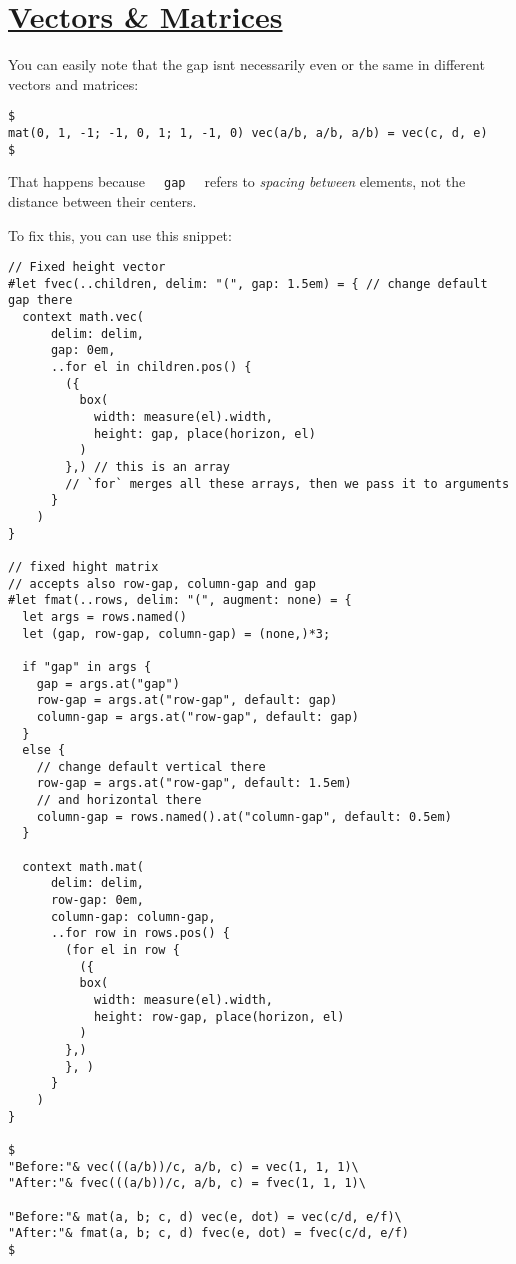 \section{\texorpdfstring{\hyperref[vectors--matrices]{Vectors \&
Matrices}}{Vectors \& Matrices}}\label{vectors--matrices}

You can easily note that the gap isn\textquotesingle t necessarily even
or the same in different vectors and matrices:

\begin{verbatim}
$
mat(0, 1, -1; -1, 0, 1; 1, -1, 0) vec(a/b, a/b, a/b) = vec(c, d, e)
$
\end{verbatim}

\pandocbounded{}

That happens because \texttt{\ }{\texttt{\ gap\ }}\texttt{\ } refers to
\emph{spacing between} elements, not the distance between their centers.

To fix this, you can use this snippet:

\begin{verbatim}
// Fixed height vector
#let fvec(..children, delim: "(", gap: 1.5em) = { // change default gap there
  context math.vec(
      delim: delim,
      gap: 0em,
      ..for el in children.pos() {
        ({
          box(
            width: measure(el).width,
            height: gap, place(horizon, el)
          )
        },) // this is an array
        // `for` merges all these arrays, then we pass it to arguments
      }
    )
}

// fixed hight matrix
// accepts also row-gap, column-gap and gap
#let fmat(..rows, delim: "(", augment: none) = {
  let args = rows.named()
  let (gap, row-gap, column-gap) = (none,)*3;

  if "gap" in args {
    gap = args.at("gap")
    row-gap = args.at("row-gap", default: gap)
    column-gap = args.at("row-gap", default: gap)
  }
  else {
    // change default vertical there
    row-gap = args.at("row-gap", default: 1.5em) 
    // and horizontal there
    column-gap = rows.named().at("column-gap", default: 0.5em)
  }

  context math.mat(
      delim: delim,
      row-gap: 0em,
      column-gap: column-gap,
      ..for row in rows.pos() {
        (for el in row {
          ({
          box(
            width: measure(el).width,
            height: row-gap, place(horizon, el)
          )
        },)
        }, )
      }
    )
}

$
"Before:"& vec(((a/b))/c, a/b, c) = vec(1, 1, 1)\
"After:"& fvec(((a/b))/c, a/b, c) = fvec(1, 1, 1)\

"Before:"& mat(a, b; c, d) vec(e, dot) = vec(c/d, e/f)\
"After:"& fmat(a, b; c, d) fvec(e, dot) = fvec(c/d, e/f)
$
\end{verbatim}

